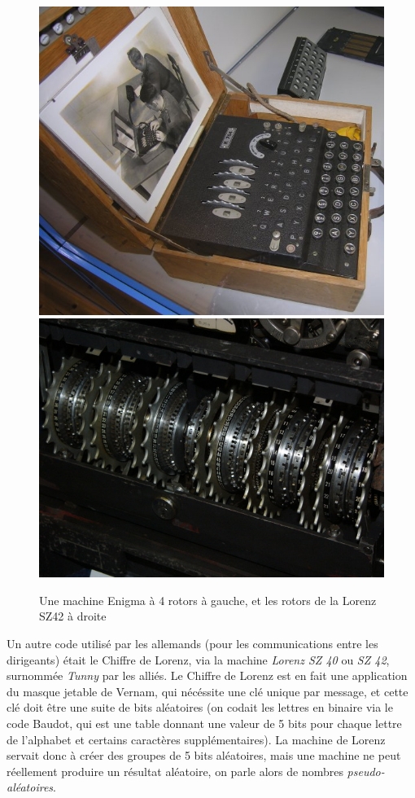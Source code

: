 \begin{figure}[h]
  \begin{center}
    \includegraphics[scale=1]{images/Enigma.jpg}
    \hspace{2cm}
    \includegraphics[scale=0.3]{images/MachineLorenz.jpg}
  \end{center}
  \caption{Une machine Enigma à 4 rotors à gauche, et les rotors de la
    Lorenz SZ42 à droite}
  \label{fig:EnigmaLorenz}
\end{figure}


Un autre code utilisé par les allemands (pour les communications entre
les dirigeants) était le Chiffre de Lorenz, via la machine
\emph{Lorenz SZ 40} ou \emph{SZ 42}, surnommée \emph{Tunny} par les alliés. Le
Chiffre de Lorenz est en fait une application du masque jetable de
Vernam, qui nécéssite une clé unique par message, et cette clé doit
être une suite de bits aléatoires (on codait les lettres en binaire
via le code Baudot, qui est une table donnant une valeur de 5 bits
pour chaque lettre de l'alphabet et certains caractères
supplémentaires). La machine de Lorenz servait donc à créer des
groupes de 5 bits aléatoires, mais une machine ne peut réellement
produire un résultat aléatoire, on parle alors de nombres
\emph{pseudo-aléatoires}.

